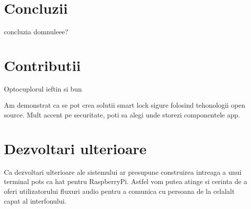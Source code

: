\section{Concluzii}

concluzia domnuleee?

\section{Contributii}

Optocuplorul ieftin si bun

Am demonstrat ca se pot crea solutii smart lock sigure folosind tehonologii open source. Mult accent pe securitate, poti sa alegi unde storezi componentele app.

\section{Dezvoltari ulterioare}

Ca dezvoltari ulterioare ale sistemului ar presupune construirea intreaga a unui terminal \acrshort{pots} ca \acrshort{hat} pentru RaspberryPi. Astfel vom putea atinge si cerinta de a oferi utilizatorului fluxuri audio pentru a comunica cu persoana de la celalalt capat al interfonului. 
